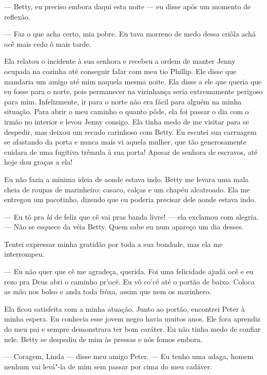 --- Betty, eu preciso embora daqui esta
noite --- eu disse após um momento de reflexão.

--- Faz o que acha certo, mia pobre. Eu
tava morreno de medo dessa criôla achá ocê mais cedo ô mais tarde.

Ela relatou o incidente à sua senhora e
recebeu a ordem de manter Jenny ocupada na cozinha até conseguir falar
com meu tio Phillip. Ele disse que mandaria um amigo até mim naquela
mesma noite. Ela disse a ele que queria que eu fosse para o norte, pois
permanecer na vizinhança seria extremamente perigoso para mim.
Infelizmente, ir para o norte não era fácil para alguém na minha
situação. Para abrir o meu caminho o quanto pôde, ela foi passar o dia
com o irmão no interior e levou Jenny consigo. Ela tinha medo de me
visitar para se despedir, mas deixou um recado carinhoso com Betty. Eu
escutei sua carruagem se afastando da porta e nunca mais vi aquela
mulher, que tão generosamente cuidara de uma fugitiva trêmula à sua
porta! Apesar de senhora de escravos, até hoje dou graças a ela!

Eu não fazia a mínima ideia de aonde
estava indo. Betty me levara uma mala cheia de roupas de marinheiro:
casaco, calças e um chapéu alcatroado. Ela me entregou um pacotinho,
dizendo que eu poderia precisar dele aonde estava indo.

--- Eu tô pra \emph{lá} de feliz que cê vai pras banda livre! --- ela
exclamou com alegria. --- Não se esquece da véia Betty. Quem sabe eu num
apareço um dia desses.

Tentei expressar minha gratidão por
toda a sua bondade, mas ela me interrompeu.

--- Eu não quer que cê me agradeça, querida. Foi uma felicidade ajudá
ocê e eu rezo pra Deus abri o caminho pr'ocê. Eu vô co'cê até o portão
de baixo. Coloca as mão nos bolso e anda toda frôxa, assim que nem os
marinhero.

Ela ficou satisfeita com a minha
atuação. Junto ao portão, encontrei Peter à minha espera. Eu conhecia
esse jovem negro havia muitos anos. Ele fora aprendiz do meu pai e
sempre demonstrara ter bom caráter. Eu não tinha medo de confiar nele.
Betty se despediu de mim às pressas e nós fomos embora.

--- Coragem, Linda --- disse meu amigo Peter. --- Eu tenho uma adaga,
homem nenhum vai levá"-la de mim sem passar por cima do meu cadáver.

